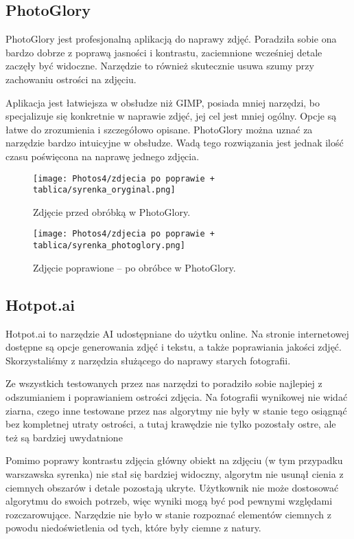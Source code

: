 \documentclass[]{mwart}
\begin{document}
\subsection{PhotoGlory}
PhotoGlory jest profesjonalną aplikacją do naprawy zdjęć. Poradziła sobie ona bardzo dobrze z poprawą jasności i kontrastu, zaciemnione wcześniej detale zaczęły być widoczne. Narzędzie to również skutecznie usuwa szumy przy zachowaniu ostrości na zdjęciu.

Aplikacja jest łatwiejsza w obsłudze niż GIMP, posiada mniej narzędzi, bo specjalizuje się konkretnie w naprawie zdjęć, jej cel jest mniej ogólny. Opcje są łatwe do zrozumienia i szczegółowo opisane. PhotoGlory można uznać za narzędzie bardzo intuicyjne w obsłudze. Wadą tego rozwiązania jest jednak ilość czasu poświęcona na naprawę jednego zdjęcia.
\begin{figure}[H]
    \centering
    \texttt{[image: Photos4/zdjecia po poprawie + tablica/syrenka\_oryginal.png]}
    \caption{Zdjęcie przed obróbką w PhotoGlory.}
\end{figure}
\begin{figure}[H]
    \centering
    \texttt{[image: Photos4/zdjecia po poprawie + tablica/syrenka\_photoglory.png]}
    \caption{Zdjęcie poprawione -- po obróbce w PhotoGlory.}
\end{figure}




\subsection{ Hotpot.ai}
Hotpot.ai to narzędzie AI udostępniane do użytku online. Na stronie internetowej dostępne są opcje generowania zdjęć i tekstu, a także poprawiania jakości zdjęć. Skorzystaliśmy z narzędzia służącego do naprawy starych fotografii.

Ze wszystkich testowanych przez nas narzędzi to poradziło sobie najlepiej z odszumianiem i poprawianiem ostrości zdjęcia. Na fotografii wynikowej nie widać ziarna, czego inne testowane przez nas algorytmy nie były w stanie tego osiągnąć bez kompletnej utraty ostrości, a tutaj krawędzie nie tylko pozostały ostre, ale też są bardziej uwydatnione

Pomimo poprawy kontrastu zdjęcia główny obiekt na zdjęciu (w tym przypadku warszawska syrenka) nie stał się bardziej widoczny, algorytm nie usunął cienia z ciemnych obszarów i detale pozostają ukryte. Użytkownik nie może dostosować algorytmu do swoich potrzeb, więc wyniki mogą być pod pewnymi względami rozczarowujące. Narzędzie nie było w stanie rozpoznać elementów ciemnych z powodu niedoświetlenia od tych, które były ciemne z natury.
\end{document}

